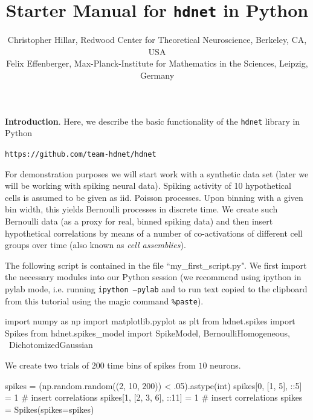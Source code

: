 \documentclass[letter, 12pt]{article}
\theoremstyle{definition}
\theoremstyle{remark}
\begin{document}
\title{Starter Manual for \texttt{hdnet} in Python}
\author{\normalsize Christopher Hillar, Redwood Center for Theoretical Neuroscience, Berkeley, CA, USA\\
\normalsize Felix Effenberger, Max-Planck-Institute for Mathematics in the Sciences, Leipzig, Germany
}
\date{}



\maketitle

\textbf{Introduction}.  Here, we describe the basic functionality of the \texttt{hdnet} library in Python

\begin{center}
\texttt{https://github.com/team-hdnet/hdnet} \\
\end{center}

For demonstration purposes we will start work with a synthetic data set  (later we will be working with spiking neural data). Spiking activity of 10 hypothetical cells is assumed to be given as iid. Poisson processes. Upon binning with a given bin width, this yields Bernoulli processes in discrete time. We create such Bernoulli data (as a proxy for real, binned spiking data) and then insert hypothetical correlations by means of a number of co-activations of different cell groups over time (also known as \textit{cell assemblies}).

The following script is contained in the file ``my\_first\_script.py".  We first import the necessary modules into our Python session (we recommend using ipython in pylab mode, i.e. running \texttt{ipython --pylab} and to run text copied to the clipboard from this tutorial using the magic command \texttt{\%paste}).

\begin{python}
import numpy as np
import matplotlib.pyplot as plt
from hdnet.spikes import Spikes
from hdnet.spikes_model import SpikeModel, BernoulliHomogeneous, \
	DichotomizedGaussian
\end{python}

We create two trials of $200$ time bins of spikes from $10$ neurons.

\begin{python}
spikes = (np.random.random((2, 10, 200)) < .05).astype(int)
spikes[0, [1, 5], ::5] = 1 # insert correlations
spikes[1, [2, 3, 6], ::11] = 1  # insert correlations
spikes = Spikes(spikes=spikes)
\end{python}
\end{document}
